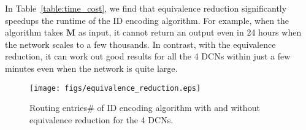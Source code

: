 \begin{table}[t]
\centering
{}
\caption{Time cost of ID encoding algorithm with and without equivalence reduction for the 4 DCNs.}\label{table:time_cost}
\end{table}

 In Table~\ref{table:time_cost}, we find that equivalence reduction significantly speedups the runtime of the ID encoding algorithm. For example, when the algorithm takes $\mathbf{M}$ as input, it cannot return an output even in 24 hours when the network scales to a few thousands. In contrast, with the equivalence reduction, it can work out good results for all the 4 DCNs within just a few minutes even when the network is quite large.

\begin{figure}[t]
\texttt{[image: figs/equivalence\_reduction.eps]}
\caption{Routing entries$\#$ of ID encoding algorithm with and without equivalence reduction for the 4 DCNs.}\label{fig:equivalence _reduction}
\end{figure}


